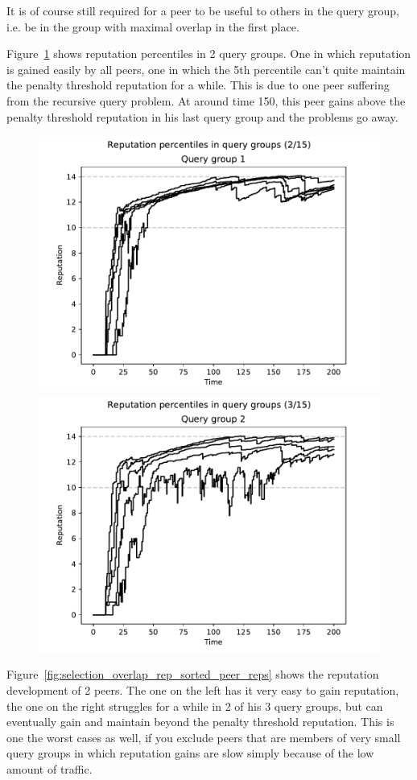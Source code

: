 It is of course still required for a peer to be useful to others in the query
group, i.e. be in the group with maximal overlap in the first place.

Figure~\ref{fig:selection_overlap_rep_sorted_rep_percs} shows reputation
percentiles in 2 query groups. One in which reputation is gained easily by all
peers, one in which the 5th percentile can't quite maintain the penalty
threshold reputation for a while. This is due to one peer suffering from the
recursive query problem. At around time 150, this peer gains above the penalty
threshold reputation in his last query group and the problems go away.

\begin{figure}[t]
\centering
\includegraphics[width=0.5\columnwidth]{figures/selection_overlap_rep_sorted_rep_percs_2_of_15}%
\includegraphics[width=0.5\columnwidth]{figures/selection_overlap_rep_sorted_rep_percs_3_of_15}
\label{fig:selection_overlap_rep_sorted_rep_percs}
\end{figure}

Figure~\ref{fig:selection_overlap_rep_sorted_peer_reps} shows the reputation
development of 2 peers. The one on the left has it very easy to gain reputation,
the one on the right struggles for a while in 2 of his 3 query groups, but can
eventually gain and maintain beyond the penalty threshold reputation. This is
one the worst cases as well, if you exclude peers that are members of very small
query groups in which reputation gains are slow simply because of the low amount
of traffic.

